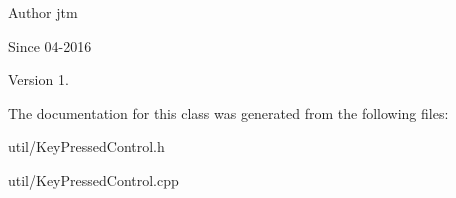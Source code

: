 \begin{DoxyAuthor}{Author}
jtm 
\end{DoxyAuthor}
\begin{DoxySince}{Since}
04-\/2016 
\end{DoxySince}
\begin{DoxyVersion}{Version}
1. 
\end{DoxyVersion}


The documentation for this class was generated from the following files\+:\begin{DoxyCompactItemize}
\item 
util/Key\+Pressed\+Control.\+h\item 
util/Key\+Pressed\+Control.\+cpp\end{DoxyCompactItemize}
